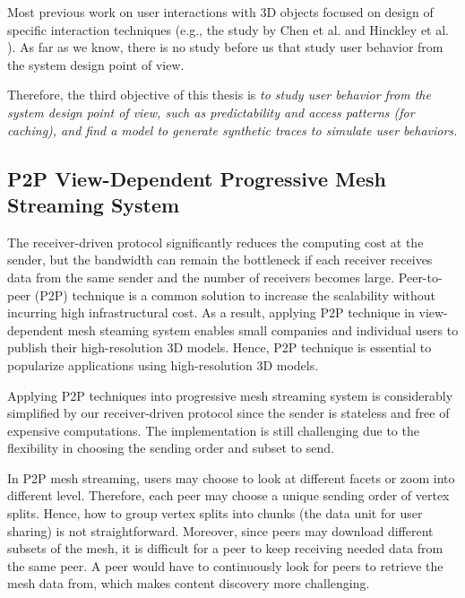     Most previous work on user interactions with 3D objects focused on design
    of specific interaction techniques (e.g., the study by Chen et al. \cite{chen88study}
    and Hinckley et al. \cite{hinckley97usability}). 
    As far as we know, there is no study before us that study user behavior
    from the system design point of view.
    
    Therefore, the third objective of this thesis is 
    \textit{
            to study user behavior from the system design point of view, 
            such as predictability and access patterns (for caching), and
            find a model to generate synthetic traces to simulate user behaviors.
            }

    \subsection{P2P View-Dependent Progressive Mesh Streaming System}
    The receiver-driven protocol significantly reduces the computing cost at the sender,
    but the bandwidth can remain the bottleneck if each receiver receives data
    from the same sender and the number of receivers becomes large. 
    Peer-to-peer (P2P) technique is a common solution to increase
    the scalability without incurring high infrastructural cost. 
    As a result, applying P2P technique in view-dependent mesh steaming
    system enables small companies and individual users to publish
    their high-resolution 3D models. Hence, P2P technique is essential
    to popularize applications using high-resolution 3D models.
    
    Applying P2P techniques into progressive mesh streaming system
    is considerably simplified by our receiver-driven protocol since 
    the sender is stateless and free of expensive computations.
    The implementation is still challenging due to the flexibility
    in choosing the sending order and subset to send.
    
    In P2P mesh streaming, users 
    may choose to look at different facets or zoom into different level.
    Therefore, each peer may choose a unique sending order of
    vertex splits. Hence, how to group vertex splits into chunks (the data unit
    for user sharing) is not straightforward. 
    Moreover, since peers may download different subsets of the
    mesh, it is difficult for a peer to keep receiving
    needed data from the same peer.  
    A peer would have to continuously look for peers to retrieve the mesh data from, 
    which makes content discovery more challenging.

